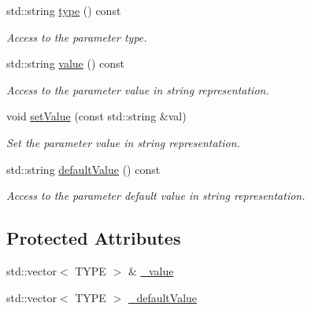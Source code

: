 \begin{DoxyCompactItemize}
std::string \hyperlink{class_d_d4hep_1_1_d_d_segmentation_1_1_typed_segmentation_parameter_3_01std_1_1vector_3_01_t_y_p_e_01_4_01_4_af67d8bae82f853555d805111b1794553}{type} () const 
\begin{DoxyCompactList}\small\item\em Access to the parameter type. \item\end{DoxyCompactList}\item 
std::string \hyperlink{class_d_d4hep_1_1_d_d_segmentation_1_1_typed_segmentation_parameter_3_01std_1_1vector_3_01_t_y_p_e_01_4_01_4_aec02d11d6f6bf666b67d22a76f70dafb}{value} () const 
\begin{DoxyCompactList}\small\item\em Access to the parameter value in string representation. \item\end{DoxyCompactList}\item 
void \hyperlink{class_d_d4hep_1_1_d_d_segmentation_1_1_typed_segmentation_parameter_3_01std_1_1vector_3_01_t_y_p_e_01_4_01_4_ad36f5a4953d42c4d9252423f129c50de}{setValue} (const std::string \&val)
\begin{DoxyCompactList}\small\item\em Set the parameter value in string representation. \item\end{DoxyCompactList}\item 
std::string \hyperlink{class_d_d4hep_1_1_d_d_segmentation_1_1_typed_segmentation_parameter_3_01std_1_1vector_3_01_t_y_p_e_01_4_01_4_a215047577378f5ffd7e92c5f19452cd2}{defaultValue} () const 
\begin{DoxyCompactList}\small\item\em Access to the parameter default value in string representation. \item\end{DoxyCompactList}\end{DoxyCompactItemize}
\subsection*{Protected Attributes}
\begin{DoxyCompactItemize}
\item 
std::vector$<$ TYPE $>$ \& \hyperlink{class_d_d4hep_1_1_d_d_segmentation_1_1_typed_segmentation_parameter_3_01std_1_1vector_3_01_t_y_p_e_01_4_01_4_ac1ad16f1b2e4175cd7c428417fa8e038}{\_\-value}
\item 
std::vector$<$ TYPE $>$ \hyperlink{class_d_d4hep_1_1_d_d_segmentation_1_1_typed_segmentation_parameter_3_01std_1_1vector_3_01_t_y_p_e_01_4_01_4_a8756d0b27bf93d8e6d00a98d3038a1bd}{\_\-defaultValue}
\end{DoxyCompactItemize}


